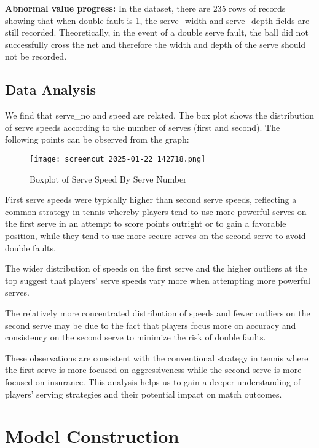 \documentclass{mcmthesis}
\begin{document}
{\bf Abnormal value progress:} In the dataset, there are 235 rows of records showing that when
double fault is 1, the serve\_width and serve\_depth fields are still recorded. Theoretically, in the
event of a double serve fault, the ball did not successfully cross the net and therefore the width and
depth of the serve should not be recorded.

\subsection{Data Analysis}
We find that serve\_no and speed are related. The box plot shows the distribution of serve
speeds according to the number of serves (first and second). The following points can be observed
from the graph:

\begin{figure}[htbp]
    \centering
    \texttt{[image: screencut 2025-01-22 142718.png]}
    \caption{Boxplot of Serve Speed By Serve Number} \label{Figure 2}
\end{figure}

First serve speeds were typically higher than second serve speeds, reflecting a common
strategy in tennis whereby players tend to use more powerful serves on the first serve in an
attempt to score points outright or to gain a favorable position, while they tend to use more secure
serves on the second serve to avoid double faults.

The wider distribution of speeds on the first serve and the higher outliers at the top suggest
that players' serve speeds vary more when attempting more powerful serves. 

The relatively more concentrated distribution of speeds and fewer outliers on the second
serve may be due to the fact that players focus more on accuracy and consistency on the second
serve to minimize the risk of double faults. 

These observations are consistent with the conventional strategy in tennis where the first
serve is more focused on aggressiveness while the second serve is more focused on insurance. This analysis helps us to gain a deeper understanding of players' serving strategies and their
potential impact on match outcomes.

\section{Model Construction}
\end{document}
